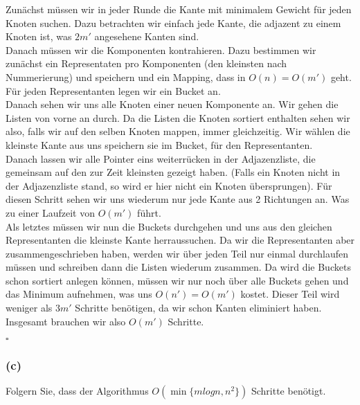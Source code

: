 \documentclass[11pt,a4paper,ngerman]{article}
\begin{document}
Zunächst müssen wir in jeder Runde die Kante mit minimalem Gewicht für
jeden Knoten suchen. Dazu betrachten wir einfach jede Kante,
die adjazent zu einem Knoten ist, was $2m'$ angesehene Kanten sind.\\

Danach müssen wir die Komponenten kontrahieren. Dazu bestimmen
wir zunächst ein Representaten pro Komponenten (den kleinsten
nach Nummerierung) und speichern und
ein Mapping, dass in $O(n) = O(m')$ geht.\\

Für jeden Representanten legen wir ein Bucket an.\\

Danach sehen wir uns alle Knoten einer neuen Komponente an. Wir gehen
die Listen von vorne an durch. Da die Listen die Knoten sortiert enthalten
sehen wir also, falls wir auf den selben Knoten mappen, immer gleichzeitig.
Wir wählen die kleinste Kante aus uns speichern sie im Bucket, für den Representanten.\\

Danach lassen wir alle Pointer eins weiterrücken in der Adjazenzliste,
die gemeinsam auf den zur Zeit kleinsten gezeigt haben. (Falls ein
Knoten nicht in der Adjazenzliste stand, so wird er hier nicht ein
Knoten übersprungen). 
Für diesen Schritt sehen wir uns wiederum nur jede Kante aus 2 Richtungen
an. Was zu einer Laufzeit von $O(m')$ führt.\\

Als letztes müssen wir nun die Buckets durchgehen und uns aus
den gleichen Representanten die kleinste Kante herraussuchen. Da wir
die Representanten aber zusammengeschrieben haben, werden wir über
jeden Teil nur einmal durchlaufen müssen und schreiben dann die Listen
wiederum zusammen. Da wird die Buckets schon sortiert anlegen können,
müssen wir nur noch über alle Buckets gehen und das Minimum aufnehmen,
was uns $O(n') = O(m')$ kostet.
Dieser Teil wird weniger als $3m'$ Schritte benötigen, da wir schon Kanten
eliminiert haben.\\

Insgesamt brauchen wir also $O(m')$ Schritte.

\mbox{}\hfill$\square$

\subsubsection*{(c)}

Folgern Sie, dass der Algorithmus $O(\min \{ m log n, n^2 \})$ Schritte benötigt.
\end{document}
